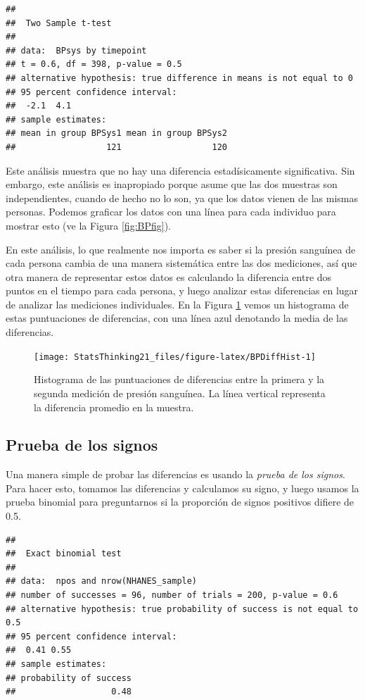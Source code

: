\documentclass[
  12pt,
]{book}
\begin{document}
\begin{verbatim}
## 
##  Two Sample t-test
## 
## data:  BPsys by timepoint
## t = 0.6, df = 398, p-value = 0.5
## alternative hypothesis: true difference in means is not equal to 0
## 95 percent confidence interval:
##  -2.1  4.1
## sample estimates:
## mean in group BPSys1 mean in group BPSys2 
##                  121                  120
\end{verbatim}

Este análisis muestra que no hay una diferencia estadísicamente significativa. Sin embargo, este análisis es inapropiado porque asume que las dos muestras son independientes, cuando de hecho no lo son, ya que los datos vienen de las mismas personas. Podemos graficar los datos con una línea para cada individuo para mostrar esto (ve la Figura \ref{fig:BPfig}).

En este análisis, lo que realmente nos importa es saber si la presión sanguínea de cada persona cambia de una manera sistemática entre las dos mediciones, así que otra manera de representar estos datos es calculando la diferencia entre dos puntos en el tiempo para cada persona, y luego analizar estas diferencias en lugar de analizar las mediciones individuales. En la Figura \ref{fig:BPDiffHist} vemos un histograma de estas puntuaciones de diferencias, con una línea azul denotando la media de las diferencias.

\begin{figure}
\texttt{[image: StatsThinking21\_files/figure-latex/BPDiffHist-1]} \caption{Histograma de las puntuaciones de diferencias entre la primera y la segunda medición de presión sanguínea. La línea vertical representa la diferencia promedio en la muestra.}\label{fig:BPDiffHist}
\end{figure}

\hypertarget{prueba-de-los-signos}{%
\subsection{Prueba de los signos}\label{prueba-de-los-signos}}

Una manera simple de probar las diferencias es usando la \emph{prueba de los signos}. Para hacer esto, tomamos las diferencias y calculamos su signo, y luego usamos la prueba binomial para preguntarnos si la proporción de signos positivos difiere de 0.5.

\begin{verbatim}
## 
##  Exact binomial test
## 
## data:  npos and nrow(NHANES_sample)
## number of successes = 96, number of trials = 200, p-value = 0.6
## alternative hypothesis: true probability of success is not equal to 0.5
## 95 percent confidence interval:
##  0.41 0.55
## sample estimates:
## probability of success 
##                   0.48
\end{verbatim}
\end{document}
